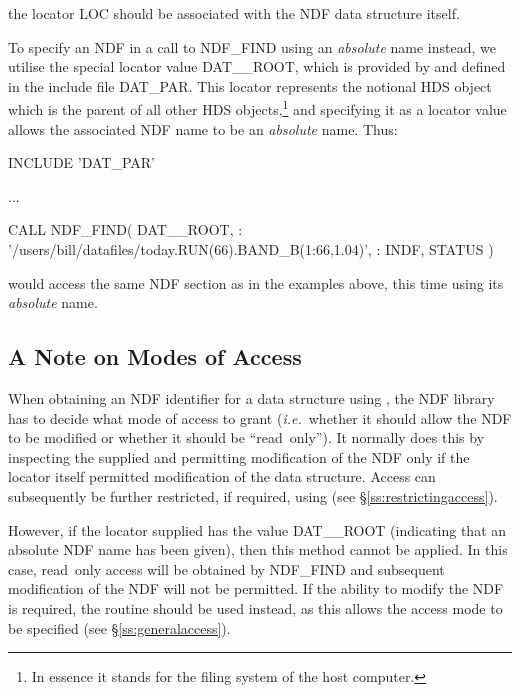 \documentclass[twoside,11pt,nolof]{starlink}
\providecommand{\st}[1]{{\emph{#1}}}
\begin{document}
the locator LOC should be associated with the NDF data structure
itself.

To specify an NDF in a call to NDF\_FIND using an \st{absolute\/}
name instead, we utilise the special locator value DAT\_\_ROOT, which
is provided by  and defined in the include file
DAT\_PAR. This locator represents the notional HDS object which is the
parent of all other HDS objects,\footnote{In essence it stands for the
filing system of the host computer.} and specifying it as a locator
value allows the associated NDF name to be an \st{absolute\/}
name. Thus:

\small
\begin{terminalv}
      INCLUDE 'DAT_PAR'

      ...

      CALL NDF_FIND( DAT__ROOT,
     :               '/users/bill/datafiles/today.RUN(66).BAND_B(1:66,1.04)',
     :               INDF, STATUS )
\end{terminalv}
\normalsize

would access the same NDF section as in the examples above, this time
using its \st{absolute\/} name.

\subsection{A Note on Modes of Access}

When obtaining an NDF identifier for a data structure using ,
the NDF library has to decide what mode of access to grant
(\st{i.e.}\ whether it should allow the NDF to be modified or whether it
should be ``read~only''). It normally does this by inspecting the
 supplied and permitting
modification of the NDF only if the
locator itself permitted modification of the data structure. Access
can subsequently be further restricted, if required, using 
(see \S\ref{ss:restrictingaccess}).

However, if the locator supplied has the value DAT\_\_ROOT (indicating
that an absolute NDF name has been given), then this method cannot be
applied. In this case, read~only access will be obtained by NDF\_FIND
and subsequent modification of the NDF will not be permitted. If the
ability to modify the NDF is required, the routine  should be
used instead, as this allows the access mode to be specified (see
\S\ref{ss:generalaccess}).
\end{document}
